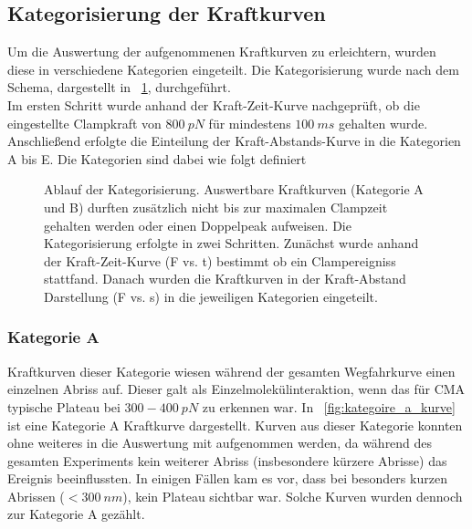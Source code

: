 \subsection{Kategorisierung der Kraftkurven}
\label{subsec:kategorisierung_der_kraftkurven}

Um die Auswertung der aufgenommenen Kraftkurven zu erleichtern, wurden diese in verschiedene Kategorien eingeteilt. Die Kategorisierung wurde nach dem Schema, dargestellt in \abb~\ref{fig:kategorisierung}, durchgeführt.\\
Im ersten Schritt wurde anhand der Kraft-Zeit-Kurve nachgeprüft, ob die eingestellte Clampkraft von $800~pN$ für mindestens $100~ms$ gehalten wurde. Anschließend erfolgte die Einteilung der Kraft-Abstands-Kurve in die Kategorien A bis E. Die Kategorien sind dabei wie folgt definiert

\begin{figure}[h]
	\centering
	\caption[Ablaufschema der Kategorisierung]{Ablauf der Kategorisierung. Auswertbare Kraftkurven (Kategorie A und B) durften zusätzlich nicht bis zur maximalen Clampzeit gehalten werden oder einen Doppelpeak aufweisen. Die Kategorisierung erfolgte in zwei Schritten. Zunächst wurde anhand der Kraft-Zeit-Kurve (F vs. t) bestimmt ob ein Clampereigniss stattfand. Danach wurden die Kraftkurven in der Kraft-Abstand Darstellung (F vs. s) in die jeweiligen Kategorien eingeteilt.}
	\label{fig:kategorisierung}
	
\end{figure}

\subsubsection{Kategorie A}
\label{subsubsec:kategorie_a}

Kraftkurven dieser Kategorie wiesen während der gesamten Wegfahrkurve einen einzelnen Abriss auf. Dieser galt als Einzelmolekülinteraktion, wenn das für \ac{CMA} typische Plateau bei $300-400~pN$ zu erkennen war. In \abb~\ref{fig:kategoire_a_kurve} ist eine Kategorie A Kraftkurve dargestellt. Kurven aus dieser Kategorie konnten ohne weiteres in die Auswertung mit aufgenommen werden, da während des gesamten Experiments kein weiterer Abriss (insbesondere kürzere Abrisse) das Ereignis beeinflussten. In einigen Fällen kam es vor, dass bei besonders kurzen Abrissen ($< 300~nm$), kein Plateau sichtbar war. Solche Kurven wurden dennoch zur Kategorie A gezählt.

